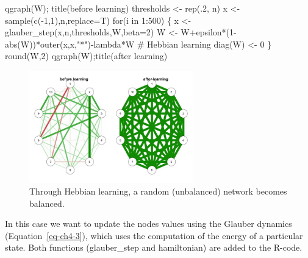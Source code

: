 \documentclass[
  letterpaper,
]{scrbook}
\newenvironment{Shaded}{\begin{snugshade}}{\end{snugshade}}
\newcommand{\AttributeTok}[1]{\textcolor[rgb]{0.40,0.45,0.13}{#1}}
\newcommand{\CommentTok}[1]{\textcolor[rgb]{0.37,0.37,0.37}{#1}}
\newcommand{\ControlFlowTok}[1]{\textcolor[rgb]{0.00,0.23,0.31}{#1}}
\newcommand{\DecValTok}[1]{\textcolor[rgb]{0.68,0.00,0.00}{#1}}
\newcommand{\FunctionTok}[1]{\textcolor[rgb]{0.28,0.35,0.67}{#1}}
\newcommand{\NormalTok}[1]{\textcolor[rgb]{0.00,0.23,0.31}{#1}}
\newcommand{\OtherTok}[1]{\textcolor[rgb]{0.00,0.23,0.31}{#1}}
\newcommand{\SpecialCharTok}[1]{\textcolor[rgb]{0.37,0.37,0.37}{#1}}
\newcommand{\StringTok}[1]{\textcolor[rgb]{0.13,0.47,0.30}{#1}}
\begin{document}
\begin{Shaded}
\begin{Highlighting}[]
\FunctionTok{qgraph}\NormalTok{(W); }\FunctionTok{title}\NormalTok{(}\StringTok{\textquotesingle{}before learning\textquotesingle{}}\NormalTok{)}
\NormalTok{thresholds }\OtherTok{\textless{}{-}} \FunctionTok{rep}\NormalTok{(.}\DecValTok{2}\NormalTok{, n)}
\NormalTok{x }\OtherTok{\textless{}{-}} \FunctionTok{sample}\NormalTok{(}\FunctionTok{c}\NormalTok{(}\SpecialCharTok{{-}}\DecValTok{1}\NormalTok{,}\DecValTok{1}\NormalTok{),n,}\AttributeTok{replace=}\NormalTok{T)}
\ControlFlowTok{for}\NormalTok{(i }\ControlFlowTok{in} \DecValTok{1}\SpecialCharTok{:}\DecValTok{500}\NormalTok{)}
\NormalTok{\{}
\NormalTok{x }\OtherTok{\textless{}{-}} \FunctionTok{glauber\_step}\NormalTok{(x,n,thresholds,W,}\AttributeTok{beta=}\DecValTok{2}\NormalTok{)}
\NormalTok{W }\OtherTok{\textless{}{-}}\NormalTok{ W}\SpecialCharTok{+}\NormalTok{epsilon}\SpecialCharTok{*}\NormalTok{(}\DecValTok{1}\SpecialCharTok{{-}}\FunctionTok{abs}\NormalTok{(W))}\SpecialCharTok{*}\FunctionTok{outer}\NormalTok{(x,x,}\StringTok{"*"}\NormalTok{)}\SpecialCharTok{{-}}\NormalTok{lambda}\SpecialCharTok{*}\NormalTok{W }\CommentTok{\# Hebbian learning}
\FunctionTok{diag}\NormalTok{(W) }\OtherTok{\textless{}{-}} \DecValTok{0}
\NormalTok{\}}
\FunctionTok{round}\NormalTok{(W,}\DecValTok{2}\NormalTok{)}
\FunctionTok{qgraph}\NormalTok{(W);}\FunctionTok{title}\NormalTok{(}\StringTok{\textquotesingle{}after learning\textquotesingle{}}\NormalTok{)}
\end{Highlighting}
\end{Shaded}

\begin{figure}

{\centering \includegraphics[width=2.7946in,height=\textheight]{media/ch6/image14.jpg}

}

\caption{\label{fig-ch6-img14-old-83}Through Hebbian learning, a random
(unbalanced) network becomes balanced.}

\end{figure}

In this case we want to update the nodes values using the Glauber
dynamics (Equation~\ref{eq-ch4-3}), which uses the computation of the
energy of a particular state. Both functions (glauber\_step and
hamiltonian) are added to the R-code.
\end{document}
